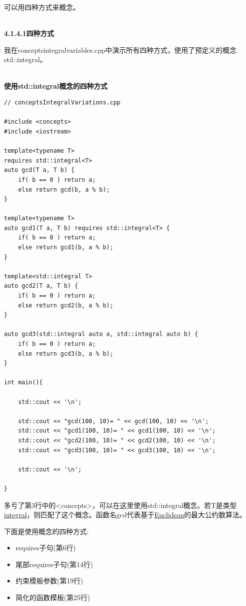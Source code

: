 
可以用四种方式来概念。

\hspace*{\fill} \\ %
\noindent
\textbf{4.1.4.1\hspace{0.2cm}四种方式}

我在conceptsintegralvariables.cpp中演示所有四种方式，使用了预定义的概念std::integral。

\hspace*{\fill} \\ %
\noindent
\textbf{使用std::integral概念的四种方式}
\begin{lstlisting}[style=styleCXX]
// conceptsIntegralVariations.cpp

#include <concepts>
#include <iostream>

template<typename T>
requires std::integral<T>
auto gcd(T a, T b) {
	if( b == 0 ) return a;
	else return gcd(b, a % b);
}

template<typename T>
auto gcd1(T a, T b) requires std::integral<T> {
	if( b == 0 ) return a;
	else return gcd1(b, a % b);
}

template<std::integral T>
auto gcd2(T a, T b) {
	if( b == 0 ) return a;
	else return gcd2(b, a % b);
}

auto gcd3(std::integral auto a, std::integral auto b) {
	if( b == 0 ) return a;
	else return gcd3(b, a % b);
}

int main(){

	std::cout << '\n';
	
	std::cout << "gcd(100, 10)= " << gcd(100, 10) << '\n';
	std::cout << "gcd1(100, 10)= " << gcd1(100, 10) << '\n';
	std::cout << "gcd2(100, 10)= " << gcd2(100, 10) << '\n';
	std::cout << "gcd3(100, 10)= " << gcd3(100, 10) << '\n';
	
	std::cout << '\n';

}
\end{lstlisting}

多亏了第3行中的<concepts>，可以在这里使用std::integral概念。若T是类型\href{https://en.cppreference.com/w/cpp/types/is_integral}{integral}，则匹配了这个概念。函数名gcd代表基于\href{https://en.wikipedia.org/wiki/Euclid}{Euclidean}的最大公约数算法。

下面是使用概念的四种方式:

\begin{itemize}
\item 
requires子句(第6行)

\item 
尾部requires子句(第14行)

\item 
约束模板参数(第19行)

\item 
简化的函数模板(第25行)
\end{itemize}

